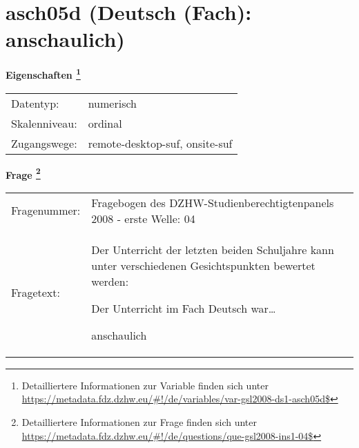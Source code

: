 
    \setcounter{footnote}{0}

    \vspace*{-1.8cm}
	\section{asch05d (Deutsch (Fach): anschaulich)}
	\label{section:asch05d}



    \vspace*{0.5cm}
    \noindent\textbf{Eigenschaften
	\footnote{Detailliertere Informationen zur Variable finden sich unter
		\url{https://metadata.fdz.dzhw.eu/\#!/de/variables/var-gsl2008-ds1-asch05d$}}}\\
	\begin{tabularx}{\hsize}{@{}lX}
	Datentyp: & numerisch \\
	Skalenniveau: & ordinal \\
	Zugangswege: &
	  remote-desktop-suf, 
	  onsite-suf
 \\
    \end{tabularx}



				\vspace*{0.5cm}
                \noindent\textbf{Frage
	                \footnote{Detailliertere Informationen zur Frage finden sich unter
		              \url{https://metadata.fdz.dzhw.eu/\#!/de/questions/que-gsl2008-ins1-04$}}}\\
				\begin{tabularx}{\hsize}{@{}lX}
					Fragenummer: &
					  Fragebogen des DZHW-Studienberechtigtenpanels 2008 - erste Welle:
					  04
 \\
					Fragetext: & Der Unterricht der letzten beiden Schuljahre kann unter verschiedenen Gesichtspunkten bewertet werden:\par  Der Unterricht im Fach Deutsch war…\par  anschaulich \\
				\end{tabularx}





